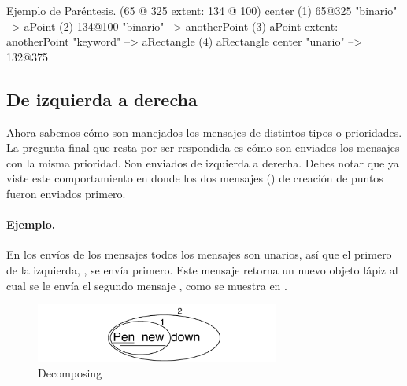 \documentclass[a4paper,10pt,twoside]{book}
\begin{document}
\begin{example}[decExtent]{Ejemplo de Paréntesis.}{}
      (65 @ 325 extent: 134 @ 100) center
(1)   65@325                                  "binario"
      --> aPoint
(2)   134@100                                 "binario"
      --> anotherPoint
(3)   aPoint extent: anotherPoint      "keyword"
      --> aRectangle
(4)   aRectangle center                    "unario"
      --> 132@375
\end{example}

\subsection{De izquierda a derecha}
Ahora sabemos cómo son manejados los mensajes de distintos tipos o prioridades. La pregunta final que resta por ser respondida es cómo son enviados los mensajes con la misma prioridad. Son enviados de izquierda a derecha. Debes notar que ya viste este comportamiento en  donde los dos mensajes () de creación de puntos fueron enviados primero.



\paragraph{Ejemplo.} En los envíos de los mensajes  todos los mensajes son unarios, así que el primero de la izquierda, , se envía primero. Este mensaje retorna un nuevo objeto lápiz al cual se le envía el segundo mensaje , como se muestra en .

\begin{figure}
	\centering
	\includegraphics[width=8cm]{ucompoUn}
	\caption{Decomposing }
\end{figure}
\end{document}
